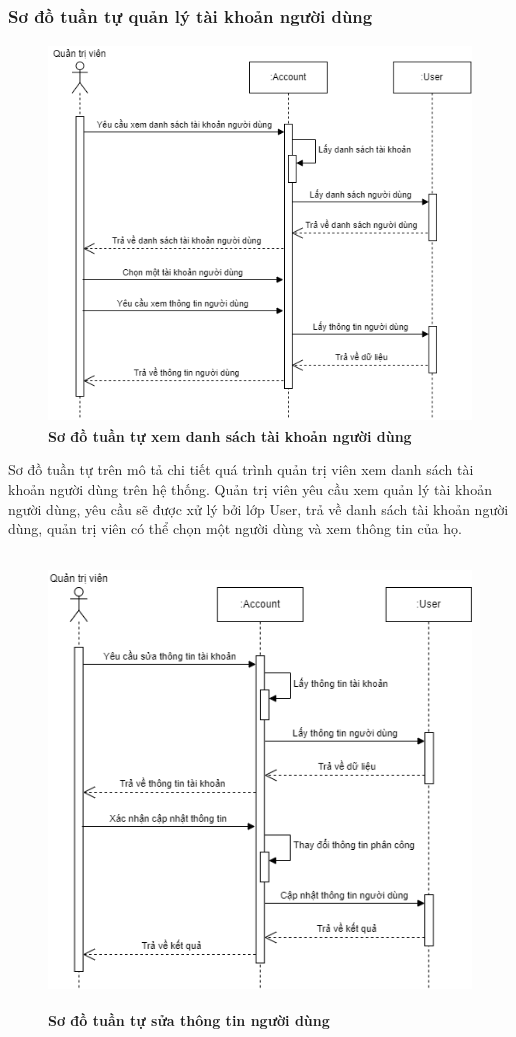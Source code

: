 \subsubsection{Sơ đồ tuần tự quản lý tài khoản người dùng}
\begin{figure}[H]
  \centering
  \includegraphics[width=11.5cm,height=10cm]{Images/sequence/sequence_manage_user.png}
  \caption[Sơ đồ tuần tự xem danh sách tài khoản người dùng]{\bfseries \fontsize{12pt}{0pt}
  \selectfont Sơ đồ tuần tự xem danh sách tài khoản người dùng}
  \label{sequence_manage_user} %
\end{figure}
Sơ đồ tuần tự trên mô tả chi tiết quá trình quản trị viên xem danh sách tài khoản người dùng trên hệ thống. Quản trị viên yêu cầu xem
quản lý tài khoản người dùng, yêu cầu sẽ được xử lý bởi lớp User, trả về danh sách tài khoản người dùng, quản trị viên có thể chọn một người dùng và xem thông tin của họ. 
\begin{figure}[H]
  \centering
  \includegraphics[width=12cm,height=12cm]{Images/sequence/sequence_manage_edit_user.png}
  \caption[Sơ đồ tuần tự sửa thông tin người dùng]{\bfseries \fontsize{12pt}{0pt}
  \selectfont Sơ đồ tuần tự sửa thông tin người dùng}
  \label{sequence_manage_edit_user} %
\end{figure}
